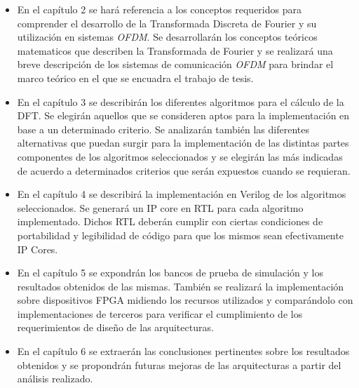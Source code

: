 \begin{itemize}
\item En el capítulo 2 se hará referencia a los conceptos requeridos para comprender el desarrollo
de la Transformada Discreta de Fourier y su utilización en sistemas \textit{OFDM}. Se desarrollarán
los conceptos teóricos matematicos que describen la Transformada de Fourier y se realizará una breve
descripción de los sistemas de comunicación \textit{OFDM} para brindar el marco teórico en el que se
encuadra el trabajo de tesis.
\item En el capítulo 3 se describirán los diferentes algoritmos para el cálculo de la DFT. Se
elegirán aquellos que se consideren aptos para la implementación en base a un determinado criterio.
Se analizarán también las diferentes alternativas que puedan surgir para la implementación de las
distintas partes componentes de los algoritmos seleccionados y se elegirán las más indicadas de
acuerdo a determinados criterios que serán expuestos cuando se requieran.
\item En el capítulo 4 se describirá la implementación en Verilog de los algoritmos seleccionados.
Se generará un IP core en RTL para cada algoritmo implementado. Dichos RTL deberán cumplir con
ciertas condiciones de portabilidad y legibilidad de código para que los mismos sean efectivamente
IP Cores.
\item En el capítulo 5 se expondrán los bancos de prueba de simulación y los resultados obtenidos de
las mismas. También se realizará la implementación sobre dispositivos FPGA midiendo los recursos
utilizados y comparándolo con implementaciones de terceros para verificar el cumplimiento de los
requerimientos de diseño de las arquitecturas.
\item En el capítulo 6 se extraerán las conclusiones pertinentes sobre los resultados obtenidos y
se propondrán futuras mejoras de las arquitecturas a partir del análisis realizado.

\end{itemize}
